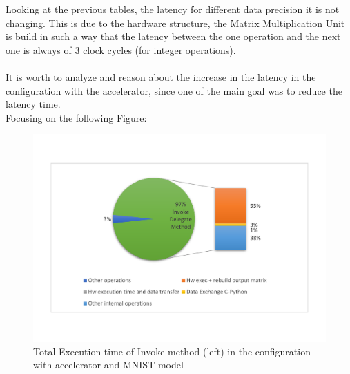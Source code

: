 Looking at the previous tables, the latency for different data precision it is not changing. This is due to the hardware structure, the Matrix Multiplication Unit is build in such a way that the latency between the one operation and the next one is always of 3 clock cycles (for integer operations).\\\\
It is worth to analyze and reason about the increase in the latency in the configuration with the accelerator, since one of the main goal was to reduce the latency time. \\
Focusing on the following Figure:
\begin{figure}[!htbp]
\centering
\captionsetup{justification=centering}
\includegraphics[scale=0.55,angle=0]{./figure/graphs/latency_subdivision_mnist.pdf}
\caption{Total Execution time of Invoke method (left) in the configuration with accelerator and MNIST model}
\label{fig:totexecmnist}
\end{figure}

